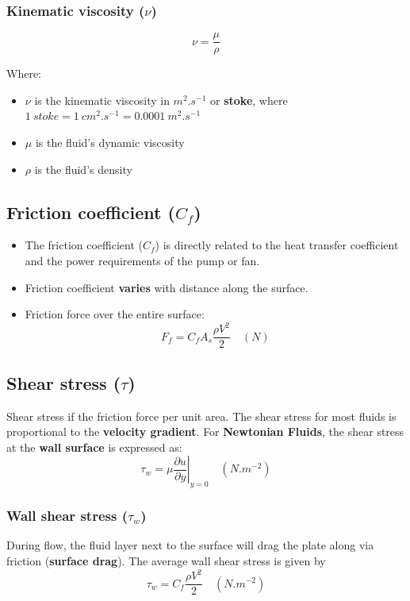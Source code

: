 \documentclass[11pt]{article}
\begin{document}
\subsubsection{Kinematic viscosity (\(\nu\))}
\label{sec:org7017eb9}
\[\nu = \frac{\mu}{\rho}\]

Where:
\begin{itemize}
\item \(\nu\) is the kinematic viscosity in \(\unit{m^2.s^{-1}}\) or \textbf{stoke}, where \(\qty{1}{stoke} = \qty{1}{cm^2.s^{-1}} = \qty{0.0001}{m^2.s^{-1}}\)
\item \(\mu\) is the fluid's dynamic viscosity
\item \(\rho\) is the fluid's density
\end{itemize}

\subsection{Friction coefficient (\(C_f\))}
\label{sec:org6cb16b2}
\begin{itemize}
\item The friction coefficient (\(C_f\)) is directly related to the heat transfer coefficient and the power requirements of the pump or fan.
\item Friction coefficient \textbf{varies} with distance along the surface.
\item Friction force over the entire surface:
\[F_f = C_f A_s \frac{\rho V^2}{2} \quad (\unit{N})\]
\end{itemize}

\subsection{Shear stress (\(\tau\))}
\label{sec:org64f622e}
Shear stress if the friction force per unit area. The shear stress for most fluids is proportional to the \textbf{velocity gradient}. For \textbf{Newtonian Fluids}, the shear stress at the \textbf{wall surface} is expressed as:
\[\tau_{w} = \mu \left. \frac{\partial u}{\partial y} \right|_{y=0} \quad (\unit{N.m^{-2}})\]

\subsubsection{Wall shear stress (\(\tau_{w}\))}
\label{sec:org06af424}
During flow, the fluid layer next to the surface will drag the plate along via friction (\textbf{surface drag}). The average wall shear stress is given by
\[\tau_{w} = C_f \frac{\rho V^2}{2} \quad (\unit{N.m^{-2}})\]
\end{document}
